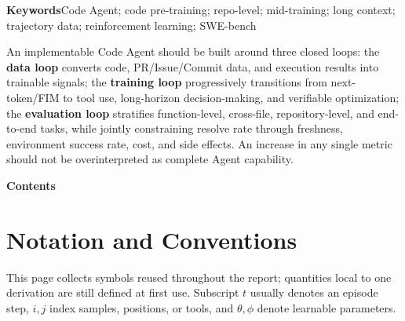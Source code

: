 \documentclass[10pt,a4paper,UTF8,fontset=none]{ctexart}
\begin{document}
\vspace{5pt}
\noindent\textbf{Keywords}\quad Code Agent; code pre-training; repo-level; mid-training; long context; trajectory data; reinforcement learning; SWE-bench

\begin{keybox}
An implementable Code Agent should be built around three closed loops: the \textbf{data loop} converts code, PR/Issue/Commit data, and execution results into trainable signals; the \textbf{training loop} progressively transitions from next-token/FIM to tool use, long-horizon decision-making, and verifiable optimization; the \textbf{evaluation loop} stratifies function-level, cross-file, repository-level, and end-to-end tasks, while jointly constraining resolve rate through freshness, environment success rate, cost, and side effects. An increase in any single metric should not be overinterpreted as complete Agent capability.
\end{keybox}

\clearpage
\begingroup
\markboth{}{}
\fancyhead[R]{}
\begin{center}
  {\Large\bfseries\color{Navy} Contents}
\end{center}
\vspace{3pt}
{\footnotesize{}\setlength{\parskip}{0pt}\tableofcontents}

\clearpage
\endgroup

\section*{Notation and Conventions}

This page collects symbols reused throughout the report; quantities local to one derivation are still defined at first use. Subscript $t$ usually denotes an episode step, $i,j$ index samples, positions, or tools, and $\theta,\phi$ denote learnable parameters.
\end{document}
